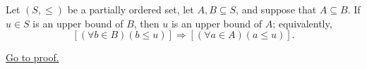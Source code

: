 \begin{lemma}
\label{lem:subset-inclusion-preserves-upper-bounds}
Let $(S,\leq)$ be a partially ordered set, let $A,B\subseteq S$, and suppose
that $A\subseteq B$. If $u\in S$ is an upper bound of $B$, then $u$ is an
upper bound of $A$; equivalently,
\[
  \left[(\forall b\in B)(b\leq u)\right]
  \Longrightarrow
  \left[(\forall a\in A)(a\leq u)\right].
\]

\hyperref[prf:subset-inclusion-preserves-upper-bounds]{Go to proof.}
\end{lemma}